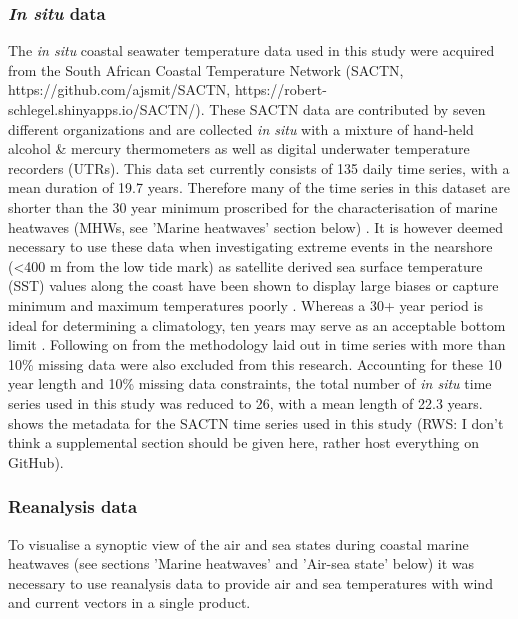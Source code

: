 \documentclass[a4paper,10pt,review]{elsarticle}
\begin{document}
\subsubsection{\emph{In situ} data}
The \emph{in situ} coastal seawater temperature data used in this study were acquired from the South African Coastal Temperature Network (SACTN, https://github.com/ajsmit/SACTN, https://robert-schlegel.shinyapps.io/SACTN/). These SACTN data are contributed by seven different organizations and are collected \emph{in situ} with a mixture of hand-held alcohol \& mercury thermometers as well as digital underwater temperature recorders (UTRs). This data set currently consists of 135 daily time series, with a mean duration of 19.7 years. Therefore many of the time series in this dataset are shorter than the 30 year minimum proscribed for the characterisation of marine heatwaves (MHWs, see 'Marine heatwaves' section below) \citep{Hobday2016}. It is however deemed necessary to use these data when investigating extreme events in the nearshore (<400 m from the low tide mark) as satellite derived sea surface temperature (SST) values along the coast have been shown to display large biases \citep{Smit2013} or capture minimum and maximum temperatures poorly \citep{Smale2009, Castillo2010}. Whereas a 30+ year period is ideal for determining a climatology, ten years may serve as an acceptable bottom limit \citep{Schlegel2017}. Following on from the methodology laid out in \citet{Schlegel2017} time series with more than 10\% missing data were also excluded from this research. Accounting for these 10 year length and 10\% missing data constraints, the total number of \emph{in situ} time series used in this study was reduced to 26, with a mean length of 22.3 years.  shows the metadata for the SACTN time series used in this study (RWS: I don't think a supplemental section should be given here, rather host everything on GitHub).

\subsubsection{Reanalysis data}
To visualise a synoptic view of the air and sea states during coastal marine heatwaves (see sections 'Marine heatwaves' and 'Air-sea state' below) it was necessary to use reanalysis data to provide air and sea temperatures with wind and current vectors in a single product.

\end{document}
